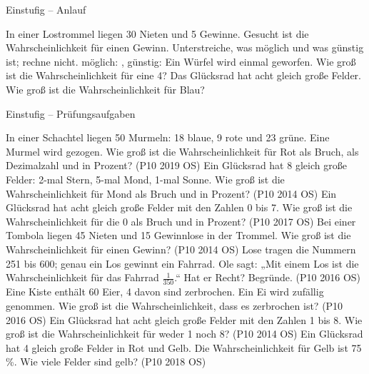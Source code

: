 \begin{aufgabe}{Einstufig – Anlauf}
\begin{teile}
\teil In einer Lostrommel liegen 30 Nieten und 5 Gewinne. Gesucht ist die Wahrscheinlichkeit für einen Gewinn. Unterstreiche, was möglich und was günstig ist; rechne nicht. möglich: \leerfeld , günstig: \leerfeld
\teil Ein Würfel wird einmal geworfen. Wie groß ist die Wahrscheinlichkeit für eine 4?
\teil Das Glücksrad hat acht gleich große Felder. Wie groß ist die Wahrscheinlichkeit für Blau?

\end{teile}
\end{aufgabe}

\begin{aufgabe}{Einstufig – Prüfungsaufgaben}
\begin{teile}
\teil In einer Schachtel liegen 50 Murmeln: 18 blaue, 9 rote und 23 grüne. Eine Murmel wird gezogen. Wie groß ist die Wahrscheinlichkeit für Rot als Bruch, als Dezimalzahl und in Prozent? \hfill (P10 2019 OS)
\teil Ein Glücksrad hat 8 gleich große Felder: 2-mal Stern, 5-mal Mond, 1-mal Sonne. Wie groß ist die Wahrscheinlichkeit für Mond als Bruch und in Prozent? \hfill (P10 2014 OS)
\teil Ein Glücksrad hat acht gleich große Felder mit den Zahlen 0 bis 7. Wie groß ist die Wahrscheinlichkeit für die 0 als Bruch und in Prozent? \hfill (P10 2017 OS)
\teil Bei einer Tombola liegen 45 Nieten und 15 Gewinnlose in der Trommel. Wie groß ist die Wahrscheinlichkeit für einen Gewinn? \hfill (P10 2014 OS)
\teil Lose tragen die Nummern 251 bis 600; genau ein Los gewinnt ein Fahrrad. Ole sagt: „Mit einem Los ist die Wahrscheinlichkeit für das Fahrrad $\frac{1}{350}$.“ Hat er Recht? Begründe. \hfill (P10 2016 OS)
\teil Eine Kiste enthält 60 Eier, 4 davon sind zerbrochen. Ein Ei wird zufällig genommen. Wie groß ist die Wahrscheinlichkeit, dass es zerbrochen ist? \hfill (P10 2016 OS)
\teil Ein Glücksrad hat acht gleich große Felder mit den Zahlen 1 bis 8. Wie groß ist die Wahrscheinlichkeit für weder 1 noch 8? \hfill (P10 2014 OS)
\teil Ein Glücksrad hat 4 gleich große Felder in Rot und Gelb. Die Wahrscheinlichkeit für Gelb ist 75\,\%. Wie viele Felder sind gelb? \hfill (P10 2018 OS)
\end{teile}
\end{aufgabe}

